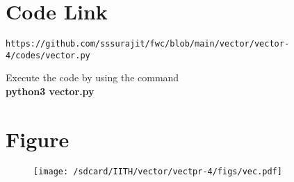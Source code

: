 \documentclass[journal,12pt,twocolumn]{IEEEtran}
\begin{document}
\section{\textbf{Code Link}}
\begin{lstlisting}
https://github.com/sssurajit/fwc/blob/main/vector/vector-4/codes/vector.py
\end{lstlisting}
Execute the code by using the command\\
\textbf{python3 vector.py}
\section{\textbf{Figure}}
\begin{figure}[!h]
\centering
\texttt{[image: /sdcard/IITH/vector/vectpr-4/figs/vec.pdf]}
\caption{}
\label{fig:vec}
\end{figure}
\end{document}
